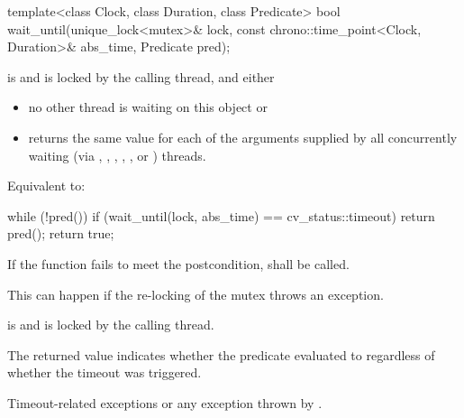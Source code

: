 %
\begin{itemdecl}
template<class Clock, class Duration, class Predicate>
  bool wait_until(unique_lock<mutex>& lock,
                  const chrono::time_point<Clock, Duration>& abs_time,
                  Predicate pred);
\end{itemdecl}
\begin{itemdescr}
 \pnum \requires {} is  and  is
                locked by the calling thread, and either

        \begin{itemize}
        \item no other thread is waiting on this  object or
        \item {} returns the same value for each of the 
                arguments supplied by all concurrently waiting (via ,
                , ,
                {\color{insertcolor} , , or }) threads.
        \end{itemize}

 \pnum \effects Equivalent to:
\begin{codeblock}
while (!pred())
  if (wait_until(lock, abs_time) == cv_status::timeout)
    return pred();
return true;
\end{codeblock}

 \pnum \remarks
        If the function fails to meet the postcondition, 
        shall be called.
        \begin{note} This can happen if the re-locking of the mutex throws an exception. \end{note}

 \pnum \postconditions {} is  and 
        is locked by the calling thread.

 \pnum \begin{note} The returned value indicates whether the predicate evaluated to
         regardless of whether the timeout was triggered. \end{note}

 \pnum \throws Timeout-related exceptions or any exception thrown by .
\end{itemdescr}




